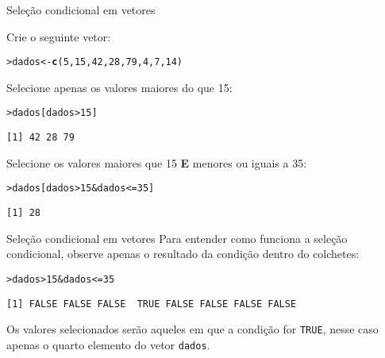 \documentclass[10pt,handout]{beamer}\usepackage{graphicx, color}
\makeatletter
\newcommand{\hlfunctioncall}[1]{\textcolor[rgb]{0,0,0.545098039215686}{\textbf{#1}}}%
\newenvironment{kframe}{%
 \def\at@end@of@kframe{}%
 \ifinner\ifhmode%
  \def\at@end@of@kframe{\end{minipage}}%
  \begin{minipage}{\columnwidth}%
 \fi\fi%
 \def\FrameCommand##1{\hskip\@totalleftmargin \hskip-\fboxsep
 \colorbox{shadecolor}{##1}\hskip-\fboxsep
     \hskip-\linewidth \hskip-\@totalleftmargin \hskip\columnwidth}%
 \MakeFramed {\advance\hsize-\width
   \@totalleftmargin\z@ \linewidth\hsize
   \@setminipage}}%
 {\par\unskip\endMakeFramed%
 \at@end@of@kframe}
\newenvironment{knitrout}{}{} %
\makeatother
\begin{document}
\begin{frame}[fragile=singleslide]{Seleção condicional em vetores}
\begin{center}
\end{center}
Crie o seguinte vetor:
\begin{knitrout}\small
{}\color{fgcolor}\begin{kframe}
\begin{alltt}
> dados <- \hlfunctioncall{c}(5, 15, 42, 28, 79, 4, 7, 14)
\end{alltt}
\end{kframe}
\end{knitrout}

Selecione apenas os valores maiores do que 15:
\begin{knitrout}\small
{}\color{fgcolor}\begin{kframe}
\begin{alltt}
> dados[dados > 15]
\end{alltt}
\begin{verbatim}
[1] 42 28 79
\end{verbatim}
\end{kframe}
\end{knitrout}

Selecione os valores maiores que 15 \textbf{E} menores ou iguais a 35:
\begin{knitrout}\small
{}\color{fgcolor}\begin{kframe}
\begin{alltt}
> dados[dados > 15 & dados <= 35]
\end{alltt}
\begin{verbatim}
[1] 28
\end{verbatim}
\end{kframe}
\end{knitrout}

\end{frame}

\begin{frame}[fragile=singleslide]{Seleção condicional em vetores}
Para entender como funciona a seleção condicional, observe apenas o
resultado da condição dentro do colchetes:
\begin{knitrout}\small
{}\color{fgcolor}\begin{kframe}
\begin{alltt}
> dados > 15 & dados <= 35
\end{alltt}
\begin{verbatim}
[1] FALSE FALSE FALSE  TRUE FALSE FALSE FALSE FALSE
\end{verbatim}
\end{kframe}
\end{knitrout}

Os valores selecionados serão aqueles em que a condição for
\texttt{TRUE}, nesse caso apenas o quarto elemento do vetor
\texttt{dados}.
\end{frame}
\end{document}
